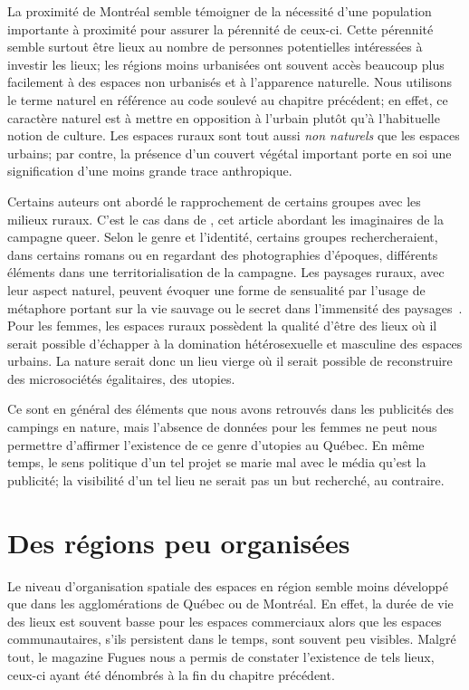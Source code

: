 La proximité de Montréal semble témoigner de la nécessité d'une population importante à proximité pour assurer la pérennité de ceux-ci.
Cette pérennité semble surtout être lieux au nombre de personnes potentielles intéressées à investir les lieux; les régions moins urbanisées ont souvent accès beaucoup plus facilement à des espaces non urbanisés et à l'apparence naturelle.
Nous utilisons le terme naturel en référence au code soulevé au chapitre précédent; en effet, ce caractère naturel est à mettre en opposition à l'urbain plutôt qu'à l'habituelle notion de culture.
Les espaces ruraux sont tout aussi \emph{non naturels} que les espaces urbains; par contre, la présence d'un couvert végétal important porte en soi une signification d'une moins grande trace anthropique.

Certains auteurs ont abordé le rapprochement de certains groupes \lgbt{} avec les milieux ruraux.
C'est le cas dans  de \citeauthor{Bell1995a}, cet article abordant les imaginaires de la campagne queer.
Selon le genre et l'identité, certains groupes rechercheraient, dans certains romans ou en regardant des photographies d'époques, différents éléments dans une territorialisation de la campagne.
Les paysages ruraux, avec leur aspect naturel, peuvent évoquer une forme de sensualité par l'usage de métaphore portant sur la vie sauvage ou le secret dans l'immensité des paysages~\citep[114]{Bell1995a}.
Pour les femmes, les espaces ruraux possèdent la qualité d'être des lieux où il serait possible d'échapper à la domination hétérosexuelle et masculine des espaces urbains.
La nature serait donc un lieu vierge où il serait possible de reconstruire des microsociétés égalitaires, des utopies.

Ce sont en général des éléments que nous avons retrouvés dans les publicités des campings en nature, mais l'absence de données pour les femmes ne peut nous permettre d'affirmer l'existence de ce genre d'utopies au Québec.
En même temps, le sens politique d'un tel projet se marie mal avec le média qu'est la publicité; la visibilité d'un tel lieu ne serait pas un but recherché, au contraire.

\section{Des régions peu organisées}
\label{sec:des_regions_peu_organisees}
Le niveau d'organisation spatiale des espaces en région semble moins développé que dans les agglomérations de Québec ou de Montréal.
En effet, la durée de vie des lieux est souvent basse pour les espaces commerciaux alors que les espaces communautaires, s'ils persistent dans le temps, sont souvent peu visibles.
Malgré tout, le magazine Fugues nous a permis de constater l'existence de tels lieux, ceux-ci ayant été dénombrés à la fin du chapitre précédent.

